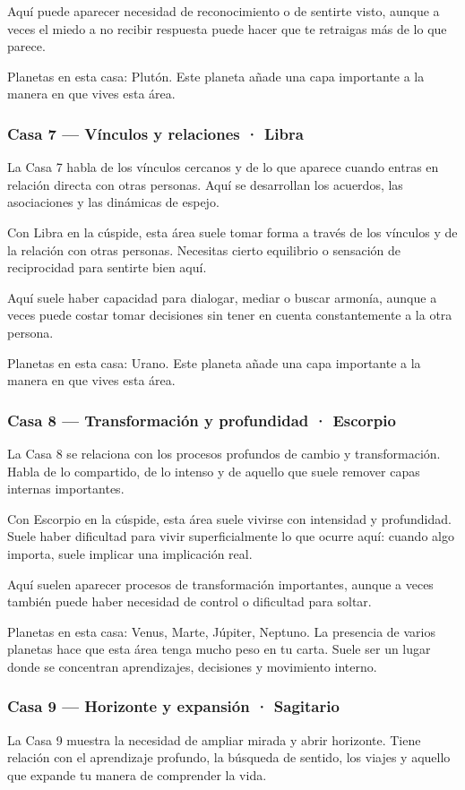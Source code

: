 \documentclass[11pt,a4paper]{article}
\begin{document}
Aquí puede aparecer necesidad de reconocimiento o de sentirte visto, aunque a veces el miedo a no recibir respuesta puede hacer que te retraigas más de lo que parece.

Planetas en esta casa: Plutón. Este planeta añade una capa importante a la manera en que vives esta área.

\subsubsection*{Casa 7 — Vínculos y relaciones · Libra}
La Casa 7 habla de los vínculos cercanos y de lo que aparece cuando entras en relación directa con otras personas. Aquí se desarrollan los acuerdos, las asociaciones y las dinámicas de espejo.

Con Libra en la cúspide, esta área suele tomar forma a través de los vínculos y de la relación con otras personas. Necesitas cierto equilibrio o sensación de reciprocidad para sentirte bien aquí.

Aquí suele haber capacidad para dialogar, mediar o buscar armonía, aunque a veces puede costar tomar decisiones sin tener en cuenta constantemente a la otra persona.

Planetas en esta casa: Urano. Este planeta añade una capa importante a la manera en que vives esta área.

\subsubsection*{Casa 8 — Transformación y profundidad · Escorpio}
La Casa 8 se relaciona con los procesos profundos de cambio y transformación. Habla de lo compartido, de lo intenso y de aquello que suele remover capas internas importantes.

Con Escorpio en la cúspide, esta área suele vivirse con intensidad y profundidad. Suele haber dificultad para vivir superficialmente lo que ocurre aquí: cuando algo importa, suele implicar una implicación real.

Aquí suelen aparecer procesos de transformación importantes, aunque a veces también puede haber necesidad de control o dificultad para soltar.

Planetas en esta casa: Venus, Marte, Júpiter, Neptuno. La presencia de varios planetas hace que esta área tenga mucho peso en tu carta. Suele ser un lugar donde se concentran aprendizajes, decisiones y movimiento interno.

\subsubsection*{Casa 9 — Horizonte y expansión · Sagitario}
La Casa 9 muestra la necesidad de ampliar mirada y abrir horizonte. Tiene relación con el aprendizaje profundo, la búsqueda de sentido, los viajes y aquello que expande tu manera de comprender la vida.
\end{document}
